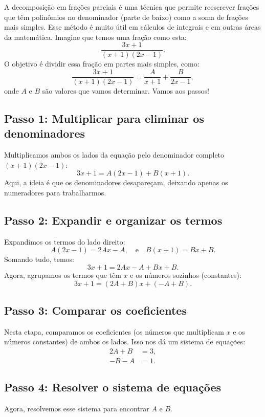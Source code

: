 \documentclass[a4paper,12pt]{article}  %
\begin{document}
A decomposição em frações parciais é uma técnica que permite reescrever frações que têm polinômios no denominador (parte de baixo) como a soma de frações mais simples. Esse método é muito útil em cálculos de integrais e em outras áreas da matemática.
Imagine que temos uma fração como esta:
\[
\frac{3x + 1}{(x+1)(2x-1)}.
\]
O objetivo é dividir essa fração em partes mais simples, como:
\[
\frac{3x + 1}{(x+1)(2x-1)} = \frac{A}{x+1} + \frac{B}{2x-1},
\]
onde \( A \) e \( B \) são valores que vamos determinar. Vamos aos passos!

\subsection{Passo 1: Multiplicar para eliminar os denominadores}

Multiplicamos ambos os lados da equação pelo denominador completo \( (x+1)(2x-1) \):
\[
3x + 1 = A(2x - 1) + B(x + 1).
\]
Aqui, a ideia é que os denominadores desapareçam, deixando apenas os numeradores para trabalharmos.

\subsection{Passo 2: Expandir e organizar os termos}

Expandimos os termos do lado direito:
\[
A(2x - 1) = 2Ax - A, \quad \text{e} \quad B(x + 1) = Bx + B.
\]
Somando tudo, temos:
\[
3x + 1 = 2Ax - A + Bx + B.
\]
Agora, agrupamos os termos que têm \( x \) e os números sozinhos (constantes):
\[
3x + 1 = (2A + B)x + (-A + B).
\]

\subsection{Passo 3: Comparar os coeficientes}

Nesta etapa, comparamos os coeficientes (os números que multiplicam \( x \) e os números constantes) de ambos os lados. Isso nos dá um sistema de equações:
\begin{align*}
2A + B & = 3, \\
-B - A & = 1.
\end{align*}

\subsection{Passo 4: Resolver o sistema de equações}

Agora, resolvemos esse sistema para encontrar \( A \) e \( B \).
\end{document}
